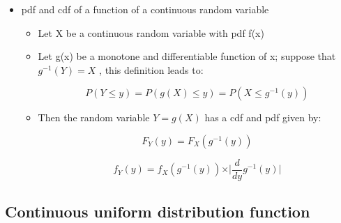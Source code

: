 \documentclass[12pt]{report}
\renewcommand{\_}{\kern-1.5pt\textunderscore\kern-1.5pt}
\begin{document}
\begin{itemize}
	\item pdf and cdf of a function of a continuous random variable\par

\begin{itemize}
	\item Let X be a continuous random variable with pdf f(x) \par

	\item Let g(x) be a monotone and differentiable function of x; suppose that  \( g^{-1} \left( Y \right) =X \) , this definition leads to:\par

 \[ P \left( Y \leq y \right) =P \left( g \left( X \right)  \leq y \right) =P \left( X \leq g^{-1} \left( y \right)  \right)  \] \par

	\item Then the random variable  \( Y=g \left( X \right)  \)  has a cdf and pdf given by:\par

 \[ F_{Y} \left( y \right) =F_{X} \left( g^{-1} \left( y \right)  \right)  \] \par

 \[ f_{Y} \left( y \right) =f_{X} \left( g^{-1} \left( y \right)  \right)  \times  \vert \frac{d}{dy}g^{-1} \left( y \right)  \vert  \] \par


\end{itemize}
\end{itemize}\subsection*{Continuous uniform distribution function}
\end{document}
